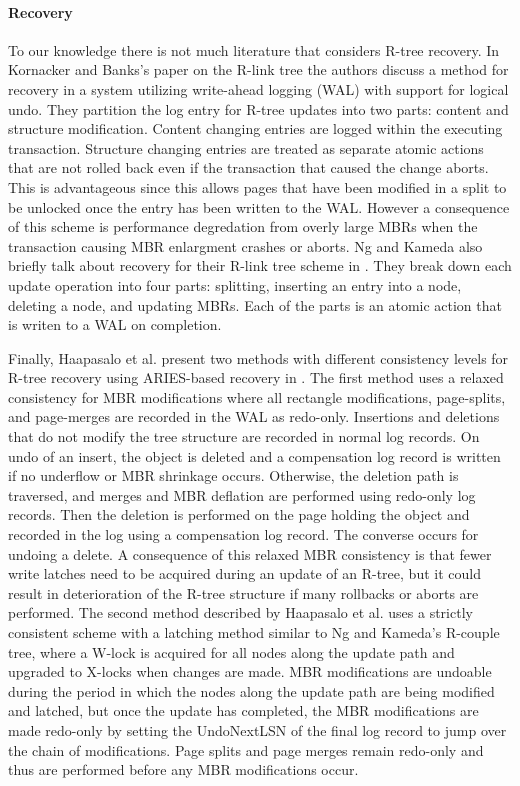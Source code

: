 \paragraph{Recovery} To our knowledge there is not much literature that considers
R-tree recovery. In Kornacker and Banks's paper on the R-link tree 
\cite{kornacker1995high} the authors discuss a method for recovery in a system 
utilizing write-ahead logging (WAL) with support for logical undo. They partition the 
log entry for R-tree updates into two parts: content and structure modification. 
Content changing entries are logged within the executing transaction. Structure 
changing entries are treated as separate atomic actions that are not rolled back 
even if the transaction that caused the change aborts. This is advantageous since
this allows pages that have been modified in a split to be unlocked once the entry
has been written to the WAL. However a consequence of this scheme is performance
degredation from overly large MBRs when the transaction causing MBR enlargment 
crashes or aborts. Ng and Kameda also briefly talk about recovery for their R-link
tree scheme in \cite{ng1994r}. They break down each update operation into four parts:
splitting, inserting an entry into a node, deleting a node, and updating MBRs. Each
of the parts is an atomic action that is writen to a WAL on completion. 

Finally, Haapasalo et al. present two methods with different consistency levels 
for R-tree recovery using ARIES-based recovery \cite{mohan1992aries} in 
\cite{haapasalo2013recovery}. The first method uses a relaxed consistency 
for MBR modifications where all rectangle modifications, page-splits, and 
page-merges are recorded in the WAL as redo-only. 
Insertions and deletions that do not modify the tree structure are recorded in 
normal log records. On undo of an insert, the object is deleted and a compensation
log record is written if no underflow or MBR shrinkage occurs. Otherwise, the deletion
path is traversed, and merges and MBR deflation are performed using redo-only log 
records. Then the deletion is performed on the page holding the object and recorded
in the log using a compensation log record. The converse occurs for undoing a delete.
A consequence of this relaxed MBR consistency is that fewer write latches need to be
acquired during an update of an R-tree, but it could result in deterioration of the 
R-tree structure if many rollbacks or aborts are performed. The second method 
described by Haapasalo et al. uses a strictly consistent scheme with a latching 
method similar to Ng and Kameda's R-couple tree\cite{ng1993concurrent}, where 
a W-lock is acquired for all nodes along the update path and upgraded to X-locks 
when changes are made. MBR modifications are undoable during the period in 
which the nodes along the update path are being modified and latched, but once 
the update has completed, the MBR modifications are made redo-only by setting 
the UndoNextLSN of the final log record to jump over the chain of modifications. 
Page splits and page merges remain redo-only and thus are performed before 
any MBR modifications occur. 

